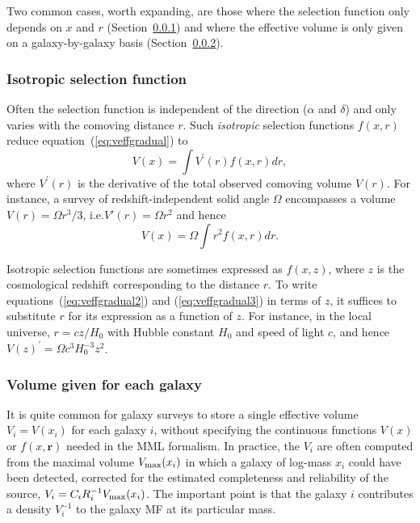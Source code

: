 \documentclass[a4paper,fleqn,usenatbib]{mnras}
\newcommand{\be}{\begin{equation}}
\newcommand{\ee}{\end{equation}}
\renewcommand{\r}{\mathbf{r}}
\newcommand{\veff}{V}%
\newcommand{\vmax}{V_{\rm max}}
\newcommand{\eq}[1]{equation~(\ref{eq:#1})}
\newcommand{\ie}{i.e.\xspace}
\begin{document}
Two common cases, worth expanding, are those where the selection function only depends on $x$ and $r$ (Section~\ref{sss:fz}) and where the effective volume is only given on a galaxy-by-galaxy basis (Section~\ref{sss:onlyvi}).

\subsubsection{Isotropic selection function}\label{sss:fz}

Often the selection function is independent of the direction ($\alpha$ and $\delta$) and only varies with the comoving distance $r$. Such \textit{isotropic} selection functions $f(x,r)$ reduce \eq{veffgradual} to
%
\be\label{eq:veffgradual2}
	\veff(x) = \int\!V^{\prime}(r) f(x,r)dr,
\ee
%
where $V^{\prime}(r)$ is the derivative of the total observed comoving volume $V(r)$. For instance, a survey of redshift-independent solid angle $\Omega$ encompasses a volume $V(r)=\Omega r^3/3$, \ie $V'(r)=\Omega r^2$ and hence
%
\be\label{eq:veffgradual3}
	\veff(x) = \Omega\int r^2 f(x,r) dr.
\ee

Isotropic selection functions are sometimes expressed as $f(x,z)$, where $z$ is the cosmological redshift corresponding to the distance $r$. To write equations~(\ref{eq:veffgradual2}) and (\ref{eq:veffgradual3}) in terms of $z$, it suffices to substitute $r$ for its expression as a function of $z$. For instance, in the local universe, $r=cz/H_0$ with Hubble constant $H_0$ and speed of light $c$, and hence $V(z)^\prime=\Omega c^3 H_0^{-3}z^2$.

\subsubsection{Volume given for each galaxy}\label{sss:onlyvi}

It is quite common for galaxy surveys to store a single effective volume $V_i=\veff(x_i)$ for each galaxy $i$, without specifying the continuous functions $\veff(x)$ or $f(x,\r)$ needed in the MML formalism. In practice, the $V_i$ are often computed from the maximal volume $\vmax(x_i)$ in which a galaxy of log-mass $x_i$ could have been detected, corrected for the estimated completeness and reliability of the source, $V_i = C_i R_i^{-1} \vmax(x_i)$. The important point is that the galaxy $i$ contributes a density $V_i^{-1}$ to the galaxy MF at its particular mass.
\end{document}
